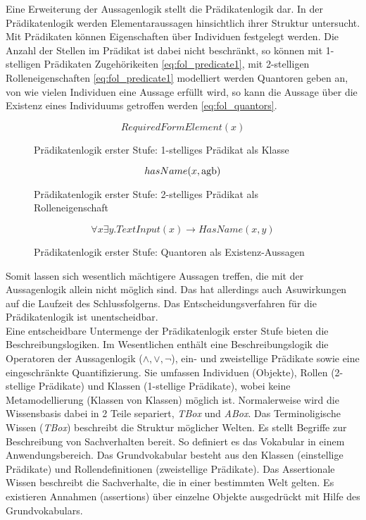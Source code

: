 \documentclass[runningheads,a4paper]{llncs}
\begin{document}
Eine Erweiterung der Aussagenlogik stellt die Prädikatenlogik dar.
In der Prädikatenlogik werden Elementaraussagen hinsichtlich ihrer Struktur untersucht.
Mit Prädikaten können Eigenschaften über Individuen festgelegt werden. 
Die Anzahl der Stellen im Prädikat ist dabei nicht beschränkt, so können mit 1-stelligen Prädikaten Zugehörikeiten \eqref{eq:fol_predicate1}, mit 2-stelligen Rolleneigenschaften \eqref{eq:fol_predicate1} modelliert werden  
Quantoren geben an, von wie vielen Individuen eine Aussage erfüllt wird, so kann die Aussage über die Existenz eines Individuums getroffen werden \eqref{eq:fol_quantors}.
\begin{figure}
\begin{equation}
RequiredFormElement(x)
\label{eq:fol_predicate1}
\end{equation}
\caption{Prädikatenlogik erster Stufe: 1-stelliges Prädikat als Klasse}
\end{figure}

\begin{figure}
\begin{equation}
hasName(x, \textnormal{agb})
\label{eq:fol_predicate2}
\end{equation}
\caption{Prädikatenlogik erster Stufe: 2-stelliges Prädikat als Rolleneigenschaft}
\end{figure}

\begin{figure}
\begin{equation}
\forall x\exists y. TextInput(x) \to HasName(x, y)
\label{eq:fol_quantors}
\end{equation}
\caption{Prädikatenlogik erster Stufe: Quantoren als Existenz-Aussagen}
\end{figure}

Somit lassen sich wesentlich mächtigere Aussagen treffen, die mit der Aussagenlogik allein nicht möglich sind.
Das hat allerdings auch Asuwirkungen auf die Laufzeit des Schlussfolgerns.
Das Entscheidungsverfahren für die Prädikatenlogik ist unentscheidbar. 
\\

Eine entscheidbare Untermenge der Prädikatenlogik erster Stufe bieten die Beschreibungslogiken.
Im Wesentlichen enthält eine Beschreibungslogik die Operatoren der Aussagenlogik (\(\land, \lor, \neg\)), ein- und zweistellige Prädikate sowie eine eingeschränkte Quantifizierung.
Sie umfassen Individuen (Objekte), Rollen (2-stellige Prädikate) und Klassen (1-stellige Prädikate), wobei keine Metamodellierung (Klassen von Klassen) möglich ist.
Normalerweise wird die Wissensbasis dabei in 2 Teile separiert, \textit{TBox} und \textit{ABox}. 
Das Terminoligische Wissen (\textit{TBox}) beschreibt die Struktur möglicher Welten. 
Es stellt Begriffe zur Beschreibung von Sachverhalten bereit. 
So definiert es das Vokabular in einem Anwendungsbereich. 
Das Grundvokabular besteht aus den Klassen (einstellige Prädikate) und Rollendefinitionen (zweistellige Prädikate). 
Das Assertionale Wissen beschreibt die Sachverhalte, die in einer bestimmten Welt gelten. 
Es existieren Annahmen (assertions) über einzelne Objekte ausgedrückt mit
Hilfe des Grundvokabulars.
\end{document}
